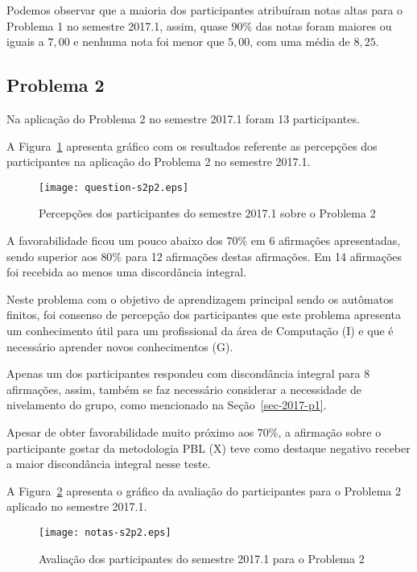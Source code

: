 Podemos observar que a maioria dos participantes atribuíram
notas altas para o Problema 1 no semestre 2017.1, assim, quase $90\%$ das notas
foram maiores ou iguais a $7,00$ e nenhuma nota foi menor que $5,00$, com uma média
de $8,25$.

\subsection{Problema 2}
Na aplicação do Problema 2 no semestre 2017.1 foram 13 participantes.

A Figura~\ref{percep-s2p2} apresenta gráfico com os resultados referente
as percepções dos participantes na aplicação do
Problema 2 no semestre 2017.1.

\begin{figure}[!htb]
\centering
\texttt{[image: question-s2p2.eps]}
\caption{Percepções dos participantes do semestre 2017.1 sobre o Problema 2}
\label{percep-s2p2}
\end{figure}

A favorabilidade ficou um pouco abaixo dos $70\%$ em 6 afirmações apresentadas,
sendo superior aos $80\%$ para 12 afirmações destas afirmações.
Em 14 afirmações foi recebida ao menos uma discordância integral.

Neste problema com o objetivo de aprendizagem principal sendo
os autômatos finitos, foi consenso de percepção dos participantes que
este problema apresenta um conhecimento útil para um profissional
da área de Computação (I) e que é necessário aprender novos
conhecimentos (G).

Apenas um dos participantes respondeu com discondância integral para
8 afirmações, assim, também se faz necessário considerar a
necessidade de nivelamento do grupo, como mencionado
na Seção~\ref{sec-2017-p1}.

Apesar de obter favorabilidade muito próximo aos $70\%$, a afirmação
sobre o participante gostar da metodologia PBL (X) teve como
destaque negativo receber a maior discondância integral nesse
teste.

A Figura~\ref{aval-s2p2} apresenta o gráfico da
avaliação do participantes para o Problema 2 aplicado no semestre 2017.1.

\begin{figure}[!htb]
\centering
\texttt{[image: notas-s2p2.eps]}
\caption{Avaliação dos participantes do semestre 2017.1 para o Problema 2}
\label{aval-s2p2}
\end{figure}

